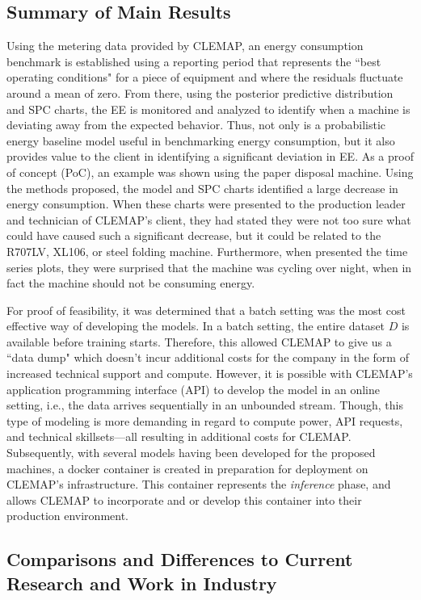 \subsection{Summary of Main Results}

Using the metering data provided by CLEMAP, an energy consumption benchmark is established using a reporting period that represents the ``best operating conditions" for a piece of equipment and where the residuals fluctuate around a mean of zero. From there, using the posterior predictive distribution and SPC charts, the EE is monitored and analyzed to identify when a machine is deviating away from the expected behavior. Thus, not only is a probabilistic energy baseline model useful in benchmarking energy consumption, but it also provides value to the client in identifying a significant deviation in EE. As a proof of concept (PoC), an example was shown using the paper disposal machine. Using the methods proposed, the model and SPC charts identified a large decrease in energy consumption. When these charts were presented to the production leader and technician of CLEMAP's client, they had stated they were not too sure what could have caused such a significant decrease, but it could be related to the R707LV, XL106, or steel folding machine. Furthermore, when presented the time series plots, they were surprised that the machine was cycling over night, when in fact the machine should not be consuming energy.

For proof of feasibility, it was determined that a batch setting was the most cost effective way of developing the models. In a batch setting, the entire dataset $D$ is available before training starts. Therefore, this allowed CLEMAP to give us a ``data dump" which doesn't incur additional costs for the company in the form of increased technical support and compute. However, it is possible with CLEMAP's application programming interface (API) to develop the model in an online setting, i.e., the data arrives sequentially in an unbounded stream. Though, this type of modeling is more demanding in regard to compute power, API requests, and technical skillsets—all resulting in additional costs for CLEMAP. Subsequently, with several models having been developed for the proposed machines, a docker container is created in preparation for deployment on CLEMAP's infrastructure. This container represents the \textit{inference} phase, and allows CLEMAP to incorporate and or develop this container into their production environment. 

\subsection{Comparisons and Differences to Current Research and Work in Industry}

